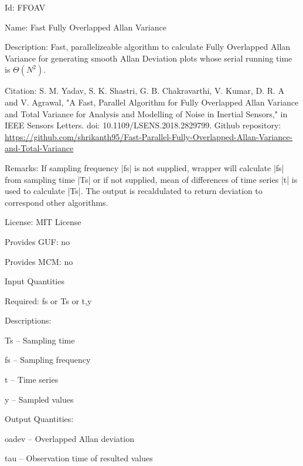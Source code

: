 \begin{tightdesc}
\item [Id:] FFOAV
\item [Name:] Fast Fully Overlapped Allan Variance
\item [Description:] Fast, parallelizeable algorithm to calculate Fully Overlapped Allan Variance for generating smooth Allan Deviation plots whose serial running time is $\Theta(N^2)$.
\item [Citation:] S. M. Yadav, S. K. Shastri, G. B. Chakravarthi, V. Kumar, D. R. A and V. Agrawal, "A Fast, Parallel Algorithm for Fully Overlapped Allan Variance and Total Variance for Analysis and Modelling of Noise in Inertial Sensors," in IEEE Sensors Letters. doi: 10.1109/LSENS.2018.2829799. Github repository: \url{https://github.com/shrikanth95/Fast-Parallel-Fully-Overlapped-Allan-Variance-and-Total-Variance}
\item [Remarks:] If sampling frequency |fs| is not supplied, wrapper will calculate |fs| from sampling time |Ts| or if not supplied, mean of differences of time series |t| is used to calculate |Ts|. The output is recaldulated to return deviation to correspond other algorithms.
\item [License:] MIT License
\item [Provides GUF:] no
\item [Provides MCM:] no
\item [Input Quantities] \rule{0em}{0em}
    \begin{tightdesc}
    \item [Required:] 
        \textsf{fs} or \textsf{Ts} or \textsf{t},\enspace \textsf{y}
    \item [Descriptions:] \rule{0em}{0em}
        \begin{tightdesc}
            \item[\textsf{Ts}] -- Sampling time
            \item[\textsf{fs}] -- Sampling frequency
            \item[\textsf{t}] -- Time series
            \item[\textsf{y}] -- Sampled values
        \end{tightdesc}
    \end{tightdesc}
\item [Output Quantities:] \rule{0em}{0em}
    \begin{tightdesc}
        \item[\textsf{oadev}] -- Overlapped Allan deviation
        \item[\textsf{tau}] -- Observation time of resulted values
    \end{tightdesc}
\end{tightdesc}
